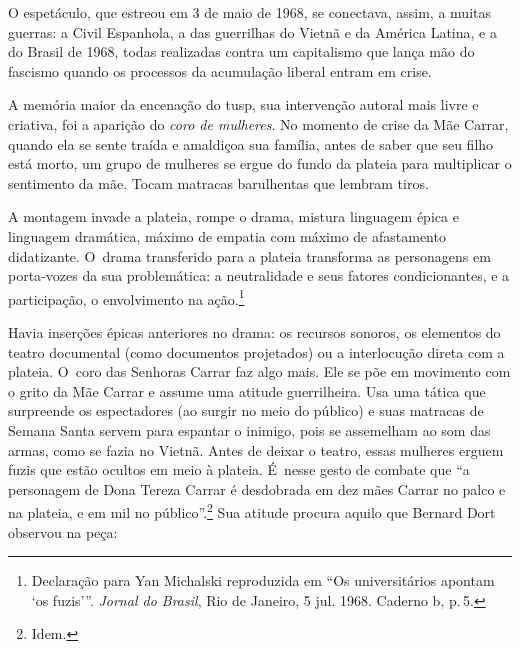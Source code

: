 {O espetáculo, que estreou em 3 de maio de 1968, se conectava, assim, a muitas
guerras: a Civil Espanhola, a das guerrilhas do Vietnã e da América
Latina, e a do Brasil de 1968, todas realizadas contra um capitalismo
que lança mão do fascismo quando os processos da acumulação liberal
entram em crise.

\page

\subject{Coro das mulheres em armas}

A memória maior da encenação do {\sc tusp}, sua intervenção autoral mais livre
e criativa, foi a aparição do {\it coro de mulheres}. No momento de
crise da Mãe Carrar, quando ela se sente traída e amaldiçoa sua família,
antes de saber que seu filho está morto, um grupo de mulheres se ergue
do fundo da plateia para multiplicar o sentimento da mãe. Tocam matracas
barulhentas que lembram tiros.


\startblockquote
A montagem invade a plateia, rompe o drama, mistura linguagem épica e
linguagem dramática, máximo de empatia com máximo de afastamento
didatizante. O~drama transferido para a plateia transforma as
personagens em porta-vozes da sua problemática: a neutralidade e seus
fatores condicionantes, e a participação, o envolvimento na
ação.\footnote{Declaração para Yan Michalski reproduzida em “Os
  universitários apontam ‘os fuzis'”. {\it Jornal do Brasil}, Rio de
  Janeiro, 5 jul. 1968. Caderno {\sc b}, p.\,5.}
\stopblockquote

Havia inserções épicas anteriores no drama: os recursos sonoros, os
elementos do teatro documental (como documentos projetados) ou a
interlocução direta com a plateia. O~coro das Senhoras Carrar faz algo
mais. Ele se põe em movimento com o grito da Mãe Carrar e assume uma
atitude guerrilheira. Usa uma tática que surpreende os
espectadores (ao surgir no meio do público) e suas matracas de Semana
Santa servem para espantar o inimigo, pois se assemelham ao som das armas,
como se fazia no Vietnã. Antes de deixar o teatro, essas mulheres
erguem fuzis que estão ocultos em meio à plateia. É~nesse gesto de
combate que “a personagem de Dona Tereza Carrar é desdobrada em dez mães
Carrar no palco e na plateia, e em mil no público”.\footnote{Idem.} Sua
atitude procura aquilo que Bernard Dort observou na peça:

}
